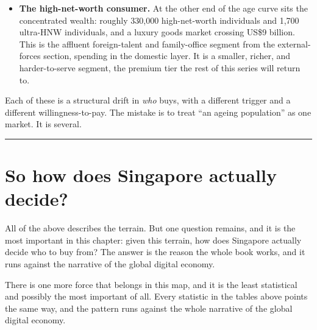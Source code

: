 \documentclass[10pt,twoside,openany]{memoir}
\begin{document}
{{{{{{{{{{{{{\begin{itemize}
\tightlist
\item
  \textbf{The high-net-worth consumer.} At the other end of the age
  curve sits the concentrated wealth: roughly 330,000 high-net-worth
  individuals and 1,700 ultra-HNW individuals, and a luxury goods market
  crossing US\$9 billion. This is the affluent foreign-talent and
  family-office segment from the external-forces section, spending in
  the domestic layer. It is a smaller, richer, and harder-to-serve
  segment, the premium tier the rest of this series will return to.
\end{itemize}

Each of these is a structural drift in \emph{who} buys, with a different
trigger and a different willingness-to-pay. The mistake is to treat ``an
ageing population'' as one market. It is several.

\begin{center}\rule{0.5\linewidth}{0.5pt}\end{center}

\FloatBarrier
\chapter{So how does Singapore actually
decide?}\label{so-how-does-singapore-actually-decide}

All of the above describes the terrain. But one question remains, and it
is the most important in this chapter: given this terrain, how does
Singapore actually decide who to buy from? The answer is the reason the
whole book works, and it runs against the narrative of the global
digital economy.

There is one more force that belongs in this map, and it is the least
statistical and possibly the most important of all. Every statistic in
the tables above points the same way, and the pattern runs against the
whole narrative of the global digital economy.

}}}}}}}}}}}}}
\end{document}
